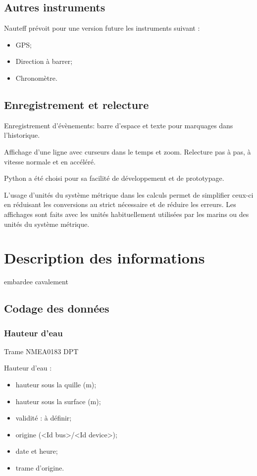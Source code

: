 \documentclass[a4paper,11pt]{report}
\begin{document}
\section{Autres instruments}
Nauteff prévoit pour une version future les instruments suivant :
\begin{itemize}
	\item GPS;
	\item Direction à barrer;
	\item Chronomètre.
\end{itemize}


\section{Enregistrement et relecture}
Enregistrement d'évènements: barre d'espace et texte pour marquages dans l'historique.

Affichage d'une ligne avec curseurs dans le temps et zoom.
Relecture pas à pas, à vitesse normale et en accéléré.

Python a été choisi pour sa facilité de développement et de prototypage.

L'usage d'unités du système métrique dans les calculs permet
de simplifier ceux-ci en réduisant les conversions au strict nécessaire
et de réduire les erreurs. Les affichages sont faits avec les unités habituellement
utilisées par les marins ou des unités du système métrique.

\chapter{Description des informations}
\gls{embardee}
\gls{cavalement}

\section{Codage des données}\label{datacoding}
\subsection{Hauteur d'eau}\label{waterheight}
Trame NMEA0183 DPT

Hauteur d'eau :
\begin{itemize}
	\item hauteur sous la quille (m);
	\item hauteur sous la surface (m);
	\item validité : à définir;
	\item origine (<Id bus>/<Id device>);
	\item date et heure;
	\item trame d'origine.
\end{itemize}
\end{document}
